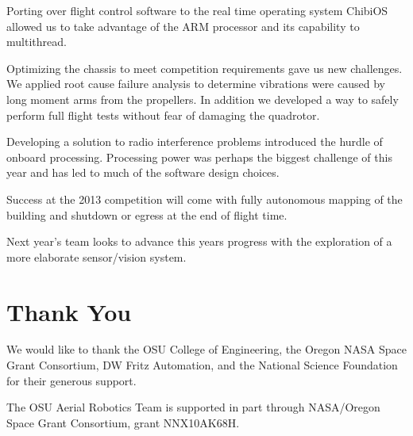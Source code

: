 \documentclass[12pt,letterpaper]{article} \usepackage[margin=1in]{geometry}
\begin{document}
Porting over flight control software to the real time operating system ChibiOS
allowed us to take advantage of the ARM processor and its capability to
multithread.

Optimizing the chassis to meet competition requirements gave us new challenges.
We applied root cause failure analysis to determine vibrations were caused by
long moment arms from the propellers. In addition we developed a way to safely
perform full flight tests without fear of damaging the quadrotor.

Developing a solution to radio interference problems introduced the hurdle of
onboard processing. Processing power was perhaps the biggest challenge of this
year and has led to much of the software design choices.

Success at the 2013 competition will come with fully autonomous mapping of the
building and shutdown or egress at the end of flight time.

Next year’s team looks to advance this years progress with the exploration of
a more elaborate sensor/vision system.



\section*{Thank You}

We would like to thank the OSU College of Engineering, the Oregon NASA Space
Grant Consortium, DW Fritz Automation, and the National Science Foundation for
their generous support.

The OSU Aerial Robotics Team is supported in part through NASA/Oregon Space
Grant Consortium, grant NNX10AK68H.
\end{document}
